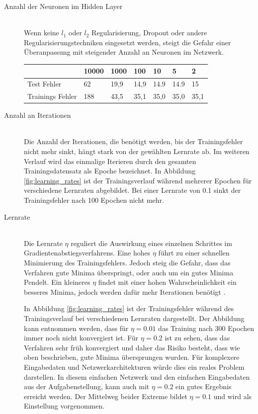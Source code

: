 \begin{description}
	\item[Anzahl der Neuronen im Hidden Layer]\hfill \\
	Wenn keine $l_1$ oder $l_2$ Regularisierung, Dropout \cite{dropout} oder andere Regularisierungstechniken eingesetzt werden, steigt die Gefahr einer Überanpassung mit steigender Anzahl an Neuronen im Netzwerk.   
	\begin{table}[h]
		\centering
		\begin{tabular}{l|llllll}
			& 10000 & 1000 & 100  & 10   & 5    & 2    \\ \hline
			Test Fehler      & 62    & 19,9 & 14,9 & 14.9 & 14.9 & 15   \\
			Trainings Fehler & 188   & 43,5 & 35,1 & 35,0 & 35,0 & 35,1
		\end{tabular}
	\end{table}
	
	\item[Anzahl an Iterationen]\hfill \\
	Die Anzahl der Iterationen, die benötigt werden, bis der Trainingsfehler nicht mehr sinkt, hängt stark von der gewählten Lernrate ab. Im weiteren Verlauf wird das einmalige Iterieren durch den gesamten Trainingsdatensatz als Epoche bezeichnet. In Abbildung \ref*{fig:learning_rates} ist der Trainingsverlauf während mehrerer Epochen für verschiedene Lernraten abgebildet. Bei einer Lernrate von 0.1 sinkt der Trainingsfehler nach 100 Epochen nicht mehr.
	
	\item[Lernrate]\hfill \\
	Die Lernrate $\eta$ reguliert die Auswirkung eines einzelnen Schrittes im Gradientenabstiegsverfahrens. Eine hohes $\eta$ führt zu einer schnellen Minimierung des Trainingsfehlers. Jedoch steig die Gefahr, dass das Verfahren gute Minima überspringt, oder auch um ein gutes Minima Pendelt. Ein kleineres $\eta$ findet mit einer hohen Wahrscheinlichkeit ein besseres Minima, jedoch werden dafür mehr Iterationen benötigt \cite{neuronalenetze}.
	
	In Abbildung \ref*{fig:learning_rates} ist der Trainingsfehler während des Trainingsverlauf bei verschiedenen Lernraten dargestellt. Der Abbildung kann entnommen werden, dass für $\eta=0.01$ das Training nach 300 Epochen immer noch nicht konvergiert ist. Für $\eta=0.2$ ist zu sehen, dass das Verfahren sehr früh konvergiert und daher das Risiko besteht, dass wie oben beschrieben, gute Minima übersprungen wurden. Für komplexere Eingabedaten und Netzwerkarchitekturen würde dies ein reales Problem darstellen. In diesem einfachen Netzwerk und den einfachen Eingabedaten aus der Aufgabenstellung, kann auch mit $\eta=0.2$ ein gutes Ergebnis erreicht werden. Der Mittelweg beider Extreme bildet $\eta=0.1$ und wird als Einstellung vorgenommen.
	

\end{description}
